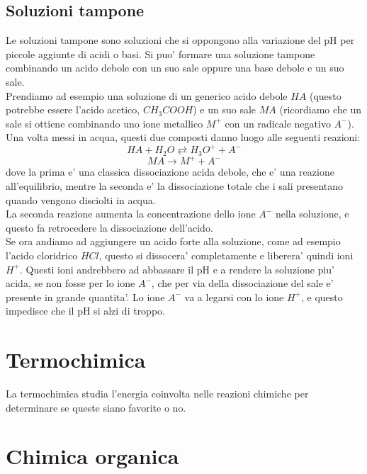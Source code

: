 \documentclass[12pt]{article}
\begin{document}
\subsection{Soluzioni tampone}
Le soluzioni tampone sono soluzioni che si oppongono alla variazione del pH per piccole aggiunte di acidi o basi. Si puo' formare una soluzione tampone combinando un acido debole con un suo sale oppure una base debole e un suo sale. \\
Prendiamo ad esempio una soluzione di un generico acido debole $HA$ (questo potrebbe essere l'acido acetico, $CH_3COOH$) e un suo sale $MA$ (ricordiamo che un sale si ottiene combinando uno ione metallico $M^+$ con un radicale negativo $A^-$). Una volta messi in acqua, questi due composti danno luogo alle seguenti reazioni:
$$
	HA + H_2O \rightleftarrows H_3O^+ + A^-
$$
$$
	MA \rightarrow M^+ + A^-
$$
dove la prima e' una classica dissociazione acida debole, che e' una reazione all'equilibrio, mentre la seconda e' la dissociazione totale che i sali presentano quando vengono disciolti in acqua. \\
La seconda reazione aumenta la concentrazione dello ione $A^-$ nella soluzione, e questo fa retrocedere la dissociazione dell'acido. \\
Se ora andiamo ad aggiungere un acido forte alla soluzione, come ad esempio l'acido cloridrico $HCl$, questo si dissocera' completamente e liberera' quindi ioni $H^+$. Questi ioni andrebbero ad abbassare il pH e a rendere la soluzione piu' acida, se non fosse per lo ione $A^-$, che per via della dissociazione del sale e' presente in grande quantita'. Lo ione $A^-$ va a legarsi con lo ione $H^+$, e questo impedisce che il pH si alzi di troppo.
\section{Termochimica}
La termochimica studia l'energia coinvolta nelle reazioni chimiche per determinare se queste siano favorite o no. 

\section{Chimica organica}
\end{document}
